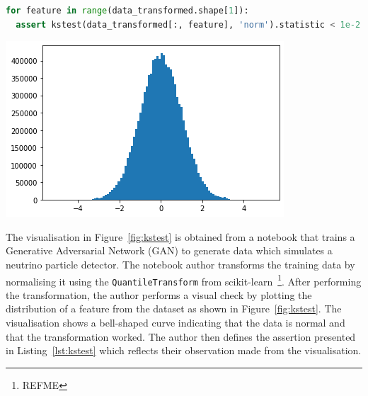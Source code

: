 \documentclass[conference]{IEEEtran}
\begin{document}
\begin{minipage}{0.45\textwidth}
  \begin{lstlisting}[language=Python]
for feature in range(data_transformed.shape[1]):
  assert kstest(data_transformed[:, feature], 'norm').statistic < 1e-2
  \end{lstlisting}
  \label{lst:kstest}
\end{minipage}
\hfill
\begin{minipage}{0.45\textwidth}
  \includegraphics[width=\linewidth]{../catalogue/select-152a.png}
  \label{fig:kstest}
\end{minipage}



The visualisation in Figure~\ref{fig:kstest} is obtained from a notebook that trains a Generative Adversarial Network (GAN) to generate data which simulates a neutrino particle detector. The notebook author transforms the training data by normalising it using the \texttt{QuantileTransform} from scikit-learn~\footnote{REFME}. After performing the transformation, the author performs a visual check by plotting the distribution of a feature from the dataset as shown in Figure~\ref{fig:kstest}. The visualisation shows a bell-shaped curve indicating that the data is normal and that the transformation worked. The author then defines the assertion presented in Listing~\ref{lst:kstest} which reflects their observation made from the visualisation.
\end{document}
